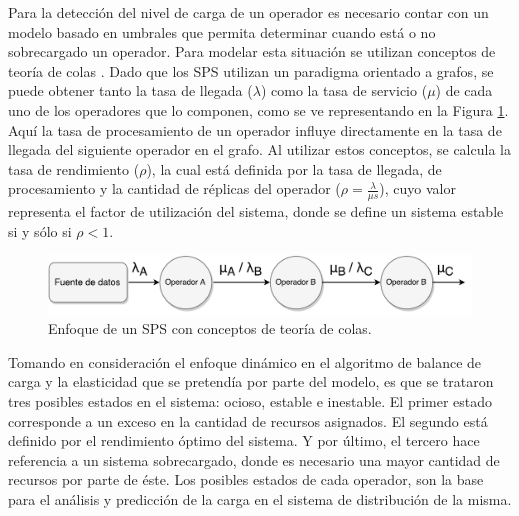 
Para la detección del nivel de carga de un operador es necesario contar con un modelo basado en umbrales que permita determinar cuando está o no sobrecargado un operador. Para modelar esta situación se utilizan conceptos de teoría de colas \citep{bose2013introduction}. Dado que los SPS utilizan un paradigma orientado a grafos, se puede obtener tanto la tasa de llegada ($\lambda$) como la tasa de servicio ($\mu$) de cada uno de los operadores que lo componen, como se ve representando en la Figura \ref{fig:analisisTeoriaColas}. Aquí la tasa de procesamiento de un operador influye directamente en la tasa de llegada del siguiente operador en el grafo. Al utilizar estos conceptos, se calcula la tasa de rendimiento ($\rho$), la cual está definida por la tasa de llegada, de procesamiento y la cantidad de réplicas del operador ($\rho = \frac{\lambda}{\mu s}$), cuyo valor representa el factor de utilización del sistema, donde se define un sistema estable si y sólo si $\rho < 1$.

\begin{figure}[!hb]
	\centering
		\includegraphics[scale=0.6]{images/AnalisisTeoriaColas.pdf}
	\caption{Enfoque de un SPS con conceptos de teoría de colas.}
	\label{fig:analisisTeoriaColas}
\end{figure}

Tomando en consideración el enfoque dinámico en el algoritmo de balance de carga y la elasticidad que se pretendía por parte del modelo, es que se trataron tres posibles estados en el sistema: ocioso, estable e inestable. El primer estado corresponde a un exceso en la cantidad de recursos asignados. El segundo está definido por el rendimiento óptimo del sistema. Y por último, el tercero hace referencia a un sistema sobrecargado, donde es necesario una mayor cantidad de recursos por parte de éste. Los posibles estados de cada operador, son la base para el análisis y predicción de la carga en el sistema de distribución de la misma.

